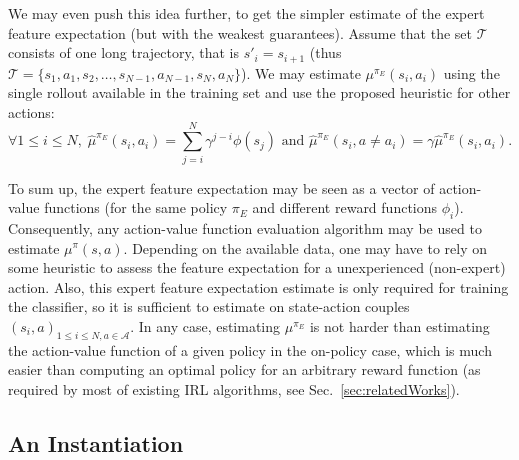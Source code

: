 \documentclass[english,utf8]{./hermes-journal}
\newcommand{\A}{\mathcal{A}}
\newcommand{\T}{\mathcal{T}}
\begin{document}
We may even push this idea further, to get the simpler estimate of
the expert feature expectation (but with the weakest guarantees).
Assume that the set $\T$ consists of one long trajectory, that is
$s'_i = s_{i+1}$ (thus $\T =
\{s_1,a_1,s_2,\dots,s_{N-1},a_{N-1},s_N,a_N\}$). We may estimate
$\mu^{\pi_E}(s_i,a_i)$ using the single rollout available in the
training set and use the proposed heuristic for other actions:
\begin{equation}
  \forall 1\leq i \leq N,\; \hat{\mu}^{\pi_E}(s_i,a_i) =
  \sum_{j=i}^N \gamma^{j-i}\phi(s_j) \text{ and }
  \hat{\mu}^{\pi_E}(s_i,a\neq a_i) = \gamma
  \hat{\mu}^{\pi_E}(s_i,a_i).
  \label{eq:mc_plus_heuristic}
\end{equation}

To sum up, the expert feature expectation may be seen as a vector of
action-value functions (for the same policy $\pi_E$ and different
reward functions $\phi_i$). Consequently, any action-value function
evaluation algorithm may be used to estimate $\mu^\pi(s,a)$.
Depending on the available data, one may have to rely on some
heuristic to assess the feature expectation for a unexperienced
(non-expert) action. Also, this expert feature expectation estimate
is only required for training the classifier, so it is sufficient to
estimate on state-action couples $(s_i,a)_{1\leq i \leq N,a\in \A}$.
In any case, estimating $\mu^{\pi_E}$ is not harder than estimating
the action-value function of a given policy in the on-policy case,
which is much easier than computing an optimal policy for an
arbitrary reward function (as required by most of existing IRL
algorithms, see Sec.~\ref{sec:relatedWorks}).


\subsection{An Instantiation}
\label{subsec:practicalApproach:instantiation}
\end{document}
